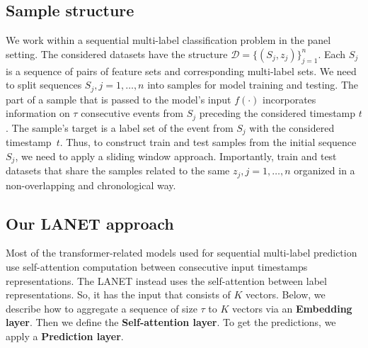 \documentclass[runningheads]{llncs}
\begin{document}
\subsection{Sample structure}


We work within a sequential multi-label classification problem in the panel setting. 
The considered datasets have the structure $\mathcal{D} = \{(S_j, z_j)\}_{j = 1}^n$.
Each $S_j$ is a sequence of pairs of feature sets and corresponding multi-label sets. We need to split sequences $S_j, j=1, \dots, n$ into samples for model training and testing. The part of a sample that is passed to the model's input $f(\cdot)$ incorporates information on $\tau$ consecutive events from $S_j$ preceding the considered timestamp $t$. The sample's target is a label set of the event from $S_j$ with the considered timestamp~$t$. 
Thus, to construct train and test samples from the initial sequence~$S_j$, we need to apply a sliding window approach. 
Importantly, train and test datasets that share the samples related to the same $z_j, j = 1, \dots, n$ organized in a non-overlapping and chronological way.

\subsection{Our LANET approach} 
\label{sec:transf_label}

Most of the transformer-related models used for sequential multi-label prediction use self-attention computation between consecutive input timestamps representations. 
The LANET instead uses the self-attention between label representations. 
So, it has the input that consists of $K$ vectors.
Below, we describe how to aggregate a sequence of size $\tau$ to $K$ vectors via an \textbf{Embedding layer}. Then we define the \textbf{Self-attention layer}.
To get the predictions, we apply a \textbf{Prediction layer}.
\end{document}
